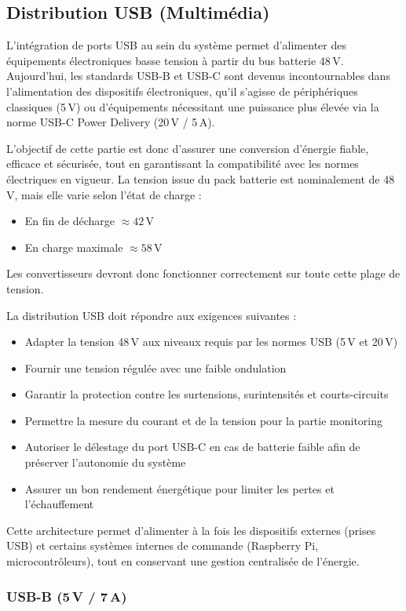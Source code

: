 \subsection{Distribution USB (Multimédia)}

L’intégration de ports USB au sein du système permet d’alimenter des équipements électroniques basse tension à partir du bus batterie 48\,V.
Aujourd’hui, les standards USB-B et USB-C sont devenus incontournables dans l’alimentation des dispositifs électroniques, qu’il s’agisse de périphériques classiques (5\,V) ou d’équipements nécessitant une puissance plus élevée via la norme USB-C Power Delivery (20\,V / 5\,A).

L’objectif de cette partie est donc d’assurer une conversion d’énergie fiable, efficace et sécurisée, tout en garantissant la compatibilité avec les normes électriques en vigueur.
La tension issue du pack batterie est nominalement de 48\,V, mais elle varie selon l’état de charge :
\begin{itemize}
    \item En fin de décharge $\approx 42$\,V
    \item En charge maximale $\approx 58$\,V
\end{itemize}
Les convertisseurs devront donc fonctionner correctement sur toute cette plage de tension.

La distribution USB doit répondre aux exigences suivantes :
\begin{itemize}
    \item Adapter la tension 48\,V aux niveaux requis par les normes USB (5\,V et 20\,V)
    \item Fournir une tension régulée avec une faible ondulation
    \item Garantir la protection contre les surtensions, surintensités et courts-circuits
    \item Permettre la mesure du courant et de la tension pour la partie monitoring
    \item Autoriser le délestage du port USB-C en cas de batterie faible afin de préserver l’autonomie du système
    \item Assurer un bon rendement énergétique pour limiter les pertes et l’échauffement
\end{itemize}
Cette architecture permet d’alimenter à la fois les dispositifs externes (prises USB) et certains systèmes internes de commande (Raspberry Pi, microcontrôleurs), tout en conservant une gestion centralisée de l’énergie.

\subsubsection{USB-B (5\,V / 7\,A)}
